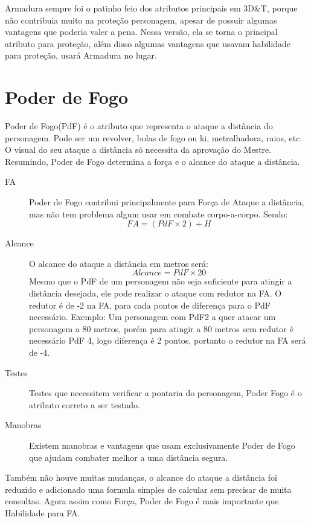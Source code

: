 \begin{framed}
Armadura sempre foi o patinho feio dos atributos principais em 3D\&T, porque não contribuia muito na proteção personagem, apesar de possuir algumas vantagens que poderia valer a pena. Nessa versão, ela se torna o principal atributo para proteção, além disso algumas vantagens que usavam habilidade para proteção, usará Armadura no lugar.
\end{framed}

\section{Poder de Fogo}

Poder de Fogo(PdF) é o atributo que representa o ataque a distância do personagem. Pode ser um revolver, bolas de fogo ou ki, metralhadora, raios, etc. O visual do seu ataque a distância só necessita da aprovação do Mestre. Resumindo, Poder de Fogo determina a força e o alcance do ataque a distância. 

\begin{description}
\item[FA] Poder de Fogo contribui principalmente para Força de Ataque a distância, mas não tem problema algum usar em combate corpo-a-corpo. Sendo:
\[ FA = (PdF \times 2) + H \]
\item[Alcance]
O alcance do ataque a distância em metros será:
\[ Alcance = PdF \times 20 \]
Mesmo que o PdF de um personagem não seja suficiente para atingir a distância desejada, ele pode realizar o ataque com redutor na FA. O redutor é de -2 na FA, para cada pontos de diferença para o PdF necessário. Exemplo: Um personagem com PdF2 a quer atacar um personagem a 80 metros, porém para atingir a 80 metros sem redutor é necessário PdF 4, logo diferença é 2 pontos, portanto o redutor na FA será de -4.
\item[Testes]
Testes que necessitem verificar a pontaria do personagem, Poder Fogo é o atributo correto a ser testado.
\item[Manobras]
Existem manobras e vantagens que usam exclusivamente Poder de Fogo que ajudam combater melhor a uma distância segura.
\end{description}

\begin{framed}
Também não houve muitas mudanças, o alcance do ataque a distância foi reduzido e adicionado uma formula simples de calcular sem precisar de muita consultas. Agora assim como Força, Poder de Fogo é mais importante que Habilidade para FA.
\end{framed}

